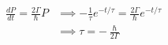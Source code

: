 \documentclass[addpoints]{exam}
\theoremstyle{mytheoremstyle}
\theoremstyle{mytheoremstyle}
\theoremstyle{myproblemstyle}
\begin{document}
\begin{questions}
\begin{solution}
\begin{enumerate}
			      \begin{equation*}
				      \begin{aligned}
					      \frac{dP}{dt} = \frac{2\Gamma}{\hslash}P & \implies -\frac{1}{\tau}e^{-t/\tau} = \frac{2\Gamma}{\hslash}e^{-t/\tau} \\
					                                               & \implies \tau = -\frac{\hslash}{2\Gamma}
				      \end{aligned}
			      \end{equation*}
		\end{enumerate}
	\end{solution}
\end{questions}

\printbibliography
\end{document}
